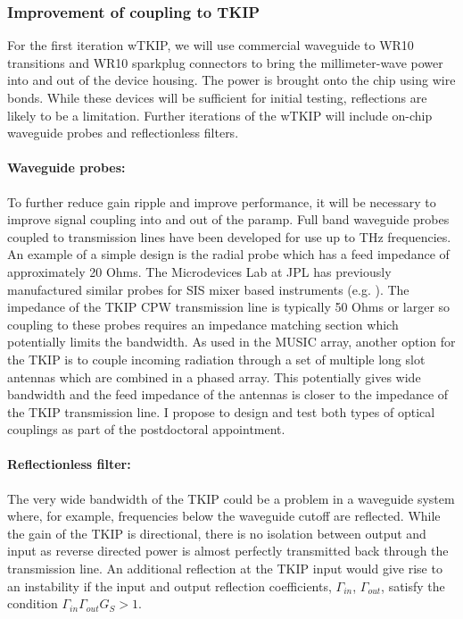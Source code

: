 \subsubsection{Improvement of coupling to TKIP} For the first iteration wTKIP, we will use commercial waveguide to WR10 transitions and WR10 sparkplug connectors to bring the millimeter-wave power into and out of the device housing. The power is brought onto the chip using wire bonds. While these devices will be sufficient for initial testing, reflections are likely to be a limitation. Further iterations of the wTKIP will include on-chip waveguide probes and reflectionless filters.


\paragraph*{Waveguide probes:} To further reduce gain ripple and improve performance, it will be necessary to improve signal coupling into and out of the paramp. Full band waveguide probes coupled to transmission lines have been developed for use up to THz frequencies. An example of a simple design is the radial probe \cite{Withington1996} which has a feed impedance of approximately 20 Ohms. The Microdevices Lab at JPL has previously manufactured similar probes for SIS mixer based instruments (e.g. \cite{Kooi2003}). The impedance of the TKIP CPW transmission line is typically 50 Ohms or larger so coupling to these probes requires an impedance matching section which potentially limits the bandwidth. As used in the MUSIC \cite{Golwala2012} array, another option for the TKIP is to couple incoming radiation through a set of multiple long slot antennas which are combined in a phased array. This potentially gives wide bandwidth and the feed impedance of the antennas is closer to the impedance of the TKIP transmission line. I propose to design and test both types of optical couplings as part of the postdoctoral appointment.

\paragraph*{Reflectionless filter:} The very wide bandwidth of the TKIP could be a problem in a waveguide system where, for example, frequencies below the waveguide cutoff are reflected. While the gain of the TKIP is directional, there is no isolation between output and input as reverse directed power is almost perfectly transmitted back through the transmission line. An additional reflection at the TKIP input would give rise to an instability if the input and output reflection coefficients, $\Gamma_{in}$, $\Gamma_{out}$, satisfy the condition  $\Gamma_{in}\Gamma_{out} G_S > 1$.

